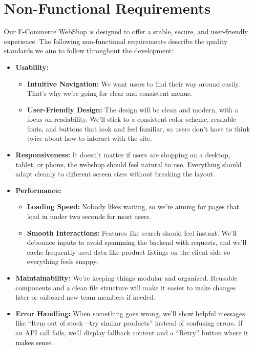 \documentclass[a4paper,12pt]{article}
\begin{document}
	
	\section{Non-Functional Requirements}  

Our E-Commerce WebShop is designed to offer a stable, secure, and user-friendly experience. The following non-functional requirements describe the quality standards we aim to follow throughout the development:

\begin{itemize}
    \item \textbf{Usability:}  
    \begin{itemize}
        \item \textbf{Intuitive Navigation:}  
        We want users to find their way around easily. That’s why we’re going for clear and consistent menus.

        \item \textbf{User-Friendly Design:}  
        The design will be clean and modern, with a focus on readability. We’ll stick to a consistent color scheme, readable fonts, and buttons that look and feel familiar, so users don’t have to think twice about how to interact with the site.
    \end{itemize}

    \item \textbf{Responsiveness:}  
    It doesn't matter if users are shopping on a desktop, tablet, or phone, the webshop should feel natural to use. Everything should adapt cleanly to different screen sizes without breaking the layout.

    \item \textbf{Performance:}  
    \begin{itemize}
        \item \textbf{Loading Speed:}  
        Nobody likes waiting, so we're aiming for pages that load in under two seconds for most users.

        \item \textbf{Smooth Interactions:}  
        Features like search should feel instant. We'll debounce inputs to avoid spamming the backend with requests, and we’ll cache frequently used data like product listings on the client side so everything feels snappy.
    \end{itemize}

    \item \textbf{Maintainability:}  
    We’re keeping things modular and organized. Reusable components and a clean file structure will make it easier to make changes later or onboard new team members if needed.

    \item \textbf{Error Handling:}  
        When something goes wrong, we'll show helpful messages like “Item out of stock—try similar products” instead of confusing errors. If an API call fails, we’ll display fallback content and a “Retry” button where it makes sense.
\end{itemize}
\end{document}
